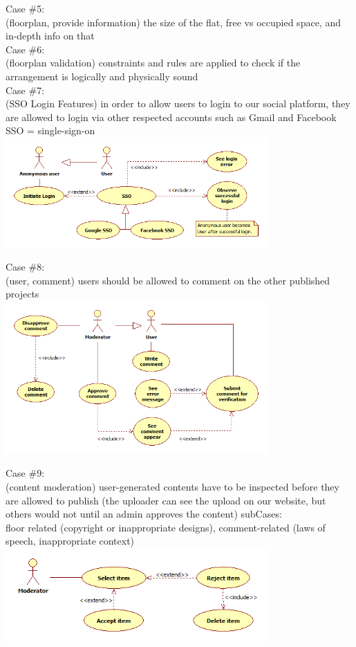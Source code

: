 			
			\noindent Case \#5:\\
			(floorplan, provide information)
			the size of the flat, free vs occupied space, and in-depth info on that\\
			
			
			\noindent Case \#6:\\
			(floorplan validation)
			constraints and rules are applied to check if the arrangement is logically and physically sound\\
			
			\newpage
			\noindent Case \#7:\\
			(SSO Login Features)
			in order to allow users to login to our social platform, they are allowed to login via other respected accounts such as Gmail and Facebook\\
			SSO = single-sign-on\\
			\includegraphics[width=0.75\textwidth]{images/UseCase7.png}
			
			\noindent Case \#8:\\
			(user, comment)
			users should be allowed to comment on the other published projects\\
			\includegraphics[width=0.75\textwidth]{images/UseCase8.png}
			
			
			\noindent Case \#9:\\
			(content moderation)
			user-generated contents have to be inspected before they are allowed to publish (the uploader can see the upload on our website, but others would not until an admin approves the content)
			sub\noindent Cases:\\ floor related (copyright or inappropriate designs), comment-related (laws of speech, inappropriate context)\\
			\includegraphics[width=0.75\textwidth]{images/UseCase9.png}
			
